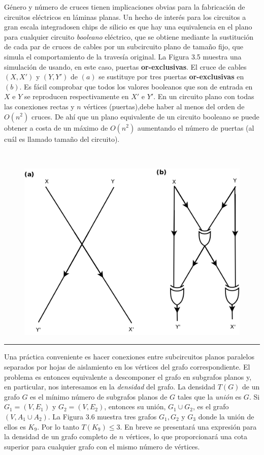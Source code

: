 \documentclass[10pt,a5paper]{book}
\begin{document}
Género y número de cruces tienen implicaciones obvias para la fabricación de circuitos eléctricos en láminas planas. Un hecho de interés para los circuitos a gran escala integradosen chips de silicio es que hay una equivalencia en el plano para cualquier circuito \emph{booleano} eléctrico, que se obtiene mediante la sustitución de cada par de cruces de cables por un subcircuito plano de tamaño fijo, que simula el comportamiento de la travesía original. La Figura 3.5 muestra una simulación de usando, en este caso, puertas \textbf{or-exclusivas}. El cruce de cables $(X,X')$ y $(Y,Y')$ de $(a)$ se sustituye por tres puertas \textbf{or-exclusivas} en $(b)$. Es fácil comprobar que todos los valores booleanos que son de entrada en $X$ e $Y$ se reproducen respectivamente en $X'$ e $Y'$. En un circuito plano con todas las conexiones rectas y $n$ vértices (puertas),debe haber al menos del orden de $O(n^2)$ cruces. De ahí que un plano equivalente de un circuito booleano se puede obtener a costa de un máximo de $O(n^2)$ aumentando el número de puertas (al cuál es llamado tamaño del circuito).

\begin{figure}[H]
\caption{ }
\hrulefill{}\\
\begin{center}\includegraphics[scale=.35]{Fig3_5.png}\end{center}
\end{figure}
\hrule{}

Una práctica conveniente es hacer conexiones entre subcircuitos planos paralelos separados por hojas de aislamiento en los vértices del grafo correspondiente. El problema es entonces equivalente a descomponer el grafo en subgrafos planos y, en particular, nos interesamos en la \emph{densidad} del grafo. La densidad $T(G)$ de un grafo $G$ es el mínimo número de subgrafos planos de $G$ tales que la \emph{unión} es $G$. Si $G_1 = (V,E_1)$ y $G_2 = (V,E_2)$, entonces su unión, $G_1 \cup G_2$, es el grafo $(V, A_1 \cup A_2)$. La Figura 3.6 muestra tres grafos $G_1, G_2$ y $G_3$ donde la unión de ellos es $K_9$. Por lo tanto $T(K_9) \le 3$. En breve se presentará una expresión para la densidad de un grafo completo de $n$ vértices, lo que proporcionará una cota superior para cualquier grafo con el mismo número de vértices.
\end{document}

